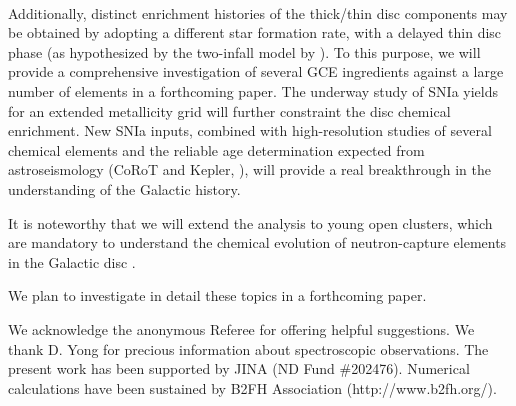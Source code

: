\documentclass[manuscript]{aastex}
\begin{document}
\\
Additionally, distinct enrichment histories of the thick/thin disc components may be obtained
by adopting a different star formation rate, with a delayed thin disc phase 
(as hypothesized by the two-infall model by \citealt{chiappini97}). To this purpose,
we will provide a comprehensive investigation of several GCE ingredients against a large 
number of elements in a forthcoming paper. The underway study of SNIa yields for an extended 
metallicity grid will further constraint the disc chemical enrichment.
New SNIa inputs,
combined with high-resolution studies of several chemical elements and the reliable age 
determination expected from astroseismology (CoRoT and Kepler, \citealt{anders16,stello15}),
will provide a real breakthrough in the understanding of the Galactic history.


 
It is noteworthy that 
we will extend the analysis to young open clusters, which are mandatory to understand 
the chemical evolution of neutron-capture elements in the Galactic disc 
\citep{maiorca12,mishenina15a}. 

We plan to investigate in detail these topics in a forthcoming paper. 

  
\acknowledgments

 We acknowledge the anonymous Referee for offering helpful suggestions.
We thank D. Yong for precious information about spectroscopic observations.
The present work has been supported by JINA (ND Fund \#202476). Numerical calculations 
have been sustained by B2FH Association (http://www.b2fh.org/).
\end{document}
